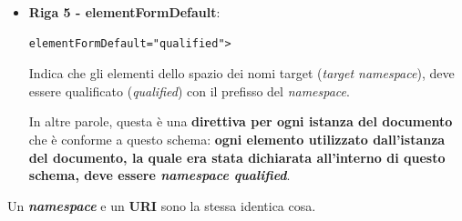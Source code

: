 \documentclass[a4paper]{article}
\begin{document}
\begin{itemize}
		\item \textcolor{Red3}{\textbf{Riga 5 - \textsf{elementFormDefault}}}:
		\begin{lstlisting}[language=XML]
elementFormDefault="qualified">\end{lstlisting}
		Indica che gli elementi dello spazio dei nomi target (\emph{target namespace}), deve essere qualificato (\emph{qualified}) con il prefisso del \emph{namespace}.
		
		In altre parole, questa è una \textbf{direttiva per ogni istanza del documento} che è conforme a questo schema: \textbf{ogni elemento utilizzato dall'istanza del documento, la quale era stata dichiarata all'interno di questo schema, deve essere \emph{namespace qualified}}.
	\end{itemize}
	Un \textbf{\emph{namespace}} e un \textbf{URI} sono la stessa identica cosa.\newpage
	
\end{document}
